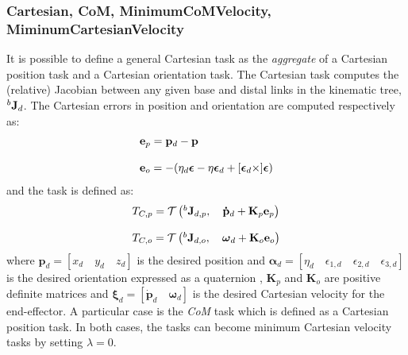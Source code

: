 \subsubsection{Cartesian, CoM, MinimumCoMVelocity, MiminumCartesianVelocity}
\label{sec:cartesian_error}
It is possible to define a general Cartesian task as the \emph{aggregate} of a Cartesian position task and a Cartesian orientation task. The Cartesian task computes the (relative) Jacobian between any given base and distal links in the kinematic tree, $^b\mathbf{J}_d$. The Cartesian errors in position and orientation are computed respectively as: 
\begin{equation}
\begin{array}{l}
\mathbf{e}_p = \mathbf{p}_d - \mathbf{p}
\\
\\
\mathbf{e}_o = -(\eta_d \boldsymbol{\epsilon} - \eta \boldsymbol{\epsilon}_d + [\boldsymbol{\epsilon}_d\times] \boldsymbol{\epsilon})
\label{eq:cartesian_error}
\end{array}
\end{equation}
and the task is defined as:
\begin{equation}
\begin{array}{l}
T_{C,p} = \mathcal{T} \left(^b\mathbf{J}_{d,p}, \quad \mathbf{\dot{p}}_d + \mathbf{K}_p\mathbf{e}_p \right)
\\
\\
T_{C,o} = \mathcal{T} \left(^b\mathbf{J}_{d,o}, \quad \boldsymbol{\omega}_d +\mathbf{K}_o\mathbf{e}_o \right)
\label{cartesian_task}
 \end{array}
 \end{equation}
where $\mathbf{p}_d = [x_d \quad y_d \quad z_d]$ is the desired position and $\boldsymbol{\alpha}_d = [\eta_d \quad \epsilon_{1,d} \quad \epsilon_{2,d} \quad \epsilon_{3,d}]$ is the desired orientation expressed as a quaternion \cite{Nakanishi08operationalspace}, $\mathbf{K}_p$ and $\mathbf{K}_o$ are positive definite matrices and $\boldsymbol{\xi}_d = \left[ \boldsymbol{\dot{p}}_d \quad \boldsymbol{\omega}_d \right]$ is the desired Cartesian velocity for the end-effector.
A particular case is the \emph{CoM} task which is defined as a Cartesian position task. 
In both cases, the tasks can become minimum Cartesian velocity tasks by setting $\lambda=0$.

